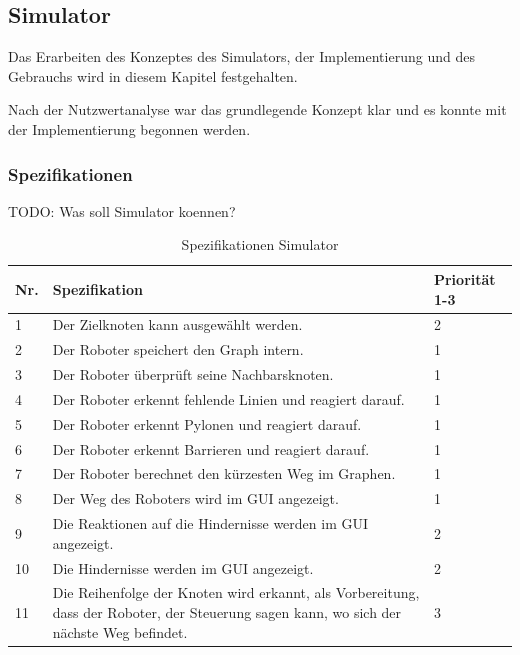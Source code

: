 \subsection{Simulator}

Das Erarbeiten des Konzeptes des Simulators, der Implementierung und des Gebrauchs wird in diesem Kapitel festgehalten.

Nach der Nutzwertanalyse war das grundlegende Konzept klar und es konnte mit der Implementierung begonnen werden.

\subsubsection{Spezifikationen}

TODO: Was soll Simulator koennen?

\begin{table}[H]
\centering
\small
\begin{tabularx}{\textwidth}{|l|X|l|}
\hline
  \textbf{Nr.} & \textbf{Spezifikation} & \textbf{Priorität 1-3}  \\
  \hline
  1  & Der Zielknoten kann ausgewählt werden. &  2\\
  \hline
   2   & Der Roboter speichert den Graph intern.  & 1\\
  \hline
   3 & Der Roboter überprüft seine Nachbarsknoten.&1\\
  \hline
  4 & Der Roboter erkennt fehlende Linien und reagiert darauf. & 1\\
  \hline
  5 &   Der Roboter erkennt Pylonen und reagiert darauf. & 1\\
  \hline
   6  &   Der Roboter erkennt Barrieren und reagiert darauf. & 1\\
  \hline
    7 &   Der Roboter berechnet den kürzesten Weg im Graphen.& 1\\
  \hline
     8  &   Der Weg des Roboters wird im GUI angezeigt. & 1\\
  \hline
      9   &   Die Reaktionen auf die Hindernisse werden im GUI angezeigt. & 2\\
  \hline
 10   &   Die Hindernisse werden im GUI angezeigt. & 2\\
  \hline
   11   &   Die Reihenfolge der Knoten wird erkannt, als Vorbereitung, dass der Roboter, der Steuerung sagen kann, wo sich der nächste Weg befindet. & 3\\
  \hline

\end{tabularx}
\caption{Spezifikationen Simulator}
\label{table:spezifikation-simulator}
\end{table}

